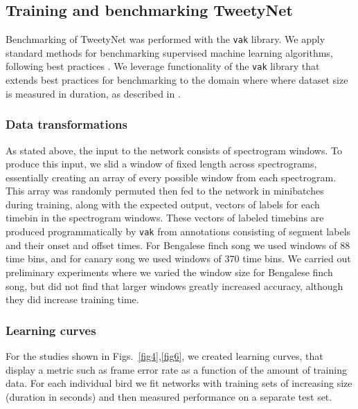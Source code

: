 \documentclass[10pt,letterpaper]{article}
\begin{document}
\subsection*{Training and benchmarking TweetyNet}
\label{methods:training}
Benchmarking of TweetyNet was performed with the \texttt{vak} library.
We apply standard methods for benchmarking supervised machine learning algorithms, following best practices \cite{james2013introduction}.
We leverage functionality of the \texttt{vak} library 
that extends best practices for benchmarking to the domain where 
where dataset size is measured in duration, as described in .

\subsubsection*{Data transformations}
As stated above, the input to the network consists of spectrogram windows. To produce this input, 
we slid a window of fixed length across spectrograms, essentially creating an array of every possible 
window from each spectrogram. This array was randomly permuted then fed to the network in minibatches 
during training, along with the expected output, vectors of labels for each timebin in the 
spectrogram windows. These vectors of labeled timebins are produced programmatically by \texttt{vak} 
from annotations consisting of segment labels and their onset and offset times.
For Bengalese finch song we used windows of 88 time bins, 
and for canary song we used windows of 370 time bins.
We carried out preliminary experiments where we varied the window size 
for Bengalese finch song, but did not find that larger windows 
greatly increased accuracy, although they did increase training time.

\subsubsection*{Learning curves}
\label{methods:learning curves}
For the studies shown in Figs.~\ref{fig4},\ref{fig6}, we created learning curves,
that display a metric such as frame error rate as a function of the amount of training data.
For each individual bird we fit networks with training sets of increasing size (duration in seconds) 
and then measured performance on a separate test set.
\end{document}
